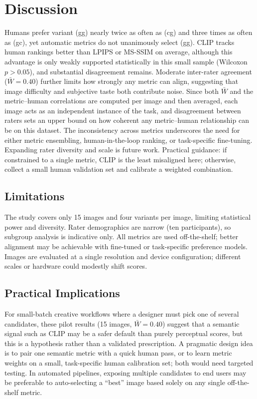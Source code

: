 \documentclass[conference]{IEEEtran}
\begin{document}
\section{Discussion}
Humans prefer variant (gg) nearly twice as often as (cg) and three times as often as (gc), yet automatic metrics do not unanimously select (gg). CLIP tracks human rankings better than LPIPS or MS-SSIM on average, although this advantage is only weakly supported statistically in this small sample (Wilcoxon $p>0.05$), and substantial disagreement remains. Moderate inter-rater agreement ($\bar{W}=0.40$) further limits how strongly any metric can align, suggesting that image difficulty and subjective taste both contribute noise. Since both $\bar{W}$ and the metric–human correlations are computed per image and then averaged, each image acts as an independent instance of the task, and disagreement between raters sets an upper bound on how coherent any metric–human relationship can be on this dataset. The inconsistency across metrics underscores the need for either metric ensembling, human-in-the-loop ranking, or task-specific fine-tuning. Expanding rater diversity and scale is future work. Practical guidance: if constrained to a single metric, CLIP is the least misaligned here; otherwise, collect a small human validation set and calibrate a weighted combination.

\subsection{Limitations}
The study covers only 15 images and four variants per image, limiting statistical power and diversity. Rater demographics are narrow (ten participants), so subgroup analysis is indicative only. All metrics are used off-the-shelf; better alignment may be achievable with fine-tuned or task-specific preference models. Images are evaluated at a single resolution and device configuration; %
different scales or hardware could modestly shift scores.

\subsection{Practical Implications}
For small-batch creative workflows where a designer must pick one of several candidates, these pilot results (15 images, $\bar{W}=0.40$) suggest that a semantic signal such as CLIP may be a safer default than purely perceptual scores, but this is a hypothesis rather than a validated prescription. A pragmatic design idea is to pair one semantic metric with a quick human pass, or to learn metric weights on a small, task-specific human calibration set; both would need targeted testing. In automated pipelines, exposing multiple candidates to end users may be preferable to auto-selecting a ``best'' image based solely on any single off-the-shelf metric.
\end{document}
